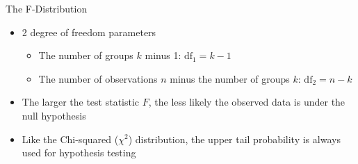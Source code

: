 \documentclass[
  ignorenonframetext,
]{beamer}
\providecommand{\tightlist}{%
  \setlength{\itemsep}{0pt}\setlength{\parskip}{0pt}}\usepackage{longtable,booktabs,array}
\begin{document}
\begin{frame}{The F-Distribution}
\label{the-f-distribution}
\begin{itemize}
\item
  2 degree of freedom parameters

  \begin{itemize}
  \item
    The number of groups \(k\) minus 1: \(\text{df}_1=k-1\)
  \item
    The number of observations \(n\) minus the number of groups \(k\):
    \(\text{df}_2=n-k\)
  \end{itemize}
\end{itemize}

\pause

\begin{itemize}
\tightlist
\item
  The larger the test statistic \(F\), the less likely the observed data
  is under the null hypothesis
\end{itemize}

\pause

\begin{itemize}
\tightlist
\item
  Like the Chi-squared (\(\chi^2\)) distribution, the upper tail
  probability is always used for hypothesis testing
\end{itemize}
\end{frame}
\end{document}
